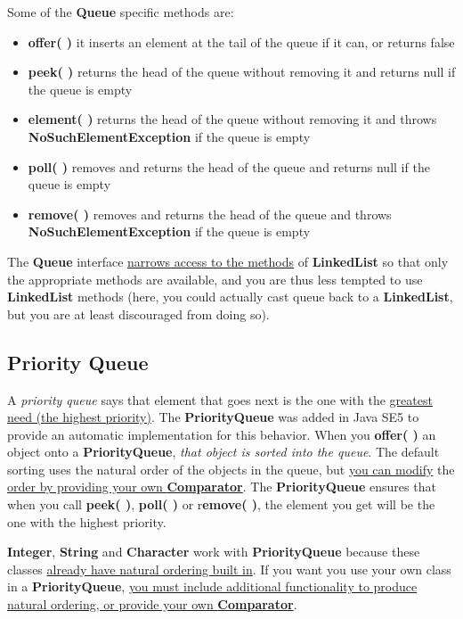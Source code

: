 \documentclass[10pt,letterpaper]{report}
\begin{document}
Some of the \textbf{Queue} specific methods are:

\begin{itemize}
\item \textbf{offer( )} it inserts an element at the tail of the queue if it can, or returns false
\item \textbf{peek( )} returns the head of the queue without removing it and returns null if the queue is empty
\item \textbf{element( )} returns the head of the queue without removing it and throws \textbf{NoSuchElementException} if the queue is empty
\item \textbf{poll( )} removes and returns the head of the queue and returns null if the queue is empty
\item \textbf{remove( )} removes and returns the head of the queue and throws \textbf{NoSuchElementException} if the queue is empty
\end{itemize}

The \textbf{Queue} interface \underline{narrows access to the methods} of \textbf{LinkedList} so that only the appropriate methods are available, and you are thus less tempted to use \textbf{LinkedList} methods (here, you could actually cast queue back to a \textbf{LinkedList}, but you are at least discouraged from doing so).

\subsection{Priority Queue}

A \textit{priority queue} says that element that goes next is the one with the \underline{greatest} \underline{need (the highest priority)}. The \textbf{PriorityQueue} was added in Java SE5 to provide an automatic implementation for this behavior.
When you \textbf{offer( )} an object onto a \textbf{PriorityQueue}, \textit{that object is sorted into the queue}. The default sorting uses the natural order of the objects in the queue, but \underline{you can modify} the \underline{order by providing your own \textbf{Comparator}}. The \textbf{PriorityQueue} ensures that when you call \textbf{peek( )}, \textbf{poll( )} or r\textbf{emove( )}, the element you get will be the one with the highest priority.

\textbf{Integer}, \textbf{String} and \textbf{Character} work with \textbf{PriorityQueue} because these classes \underline{already have natural ordering built in}. If you want you use your own class in a \textbf{PriorityQueue}, \underline{you must include additional functionality to produce} \underline{natural ordering, or provide your own \textbf{Comparator}}.
\end{document}
